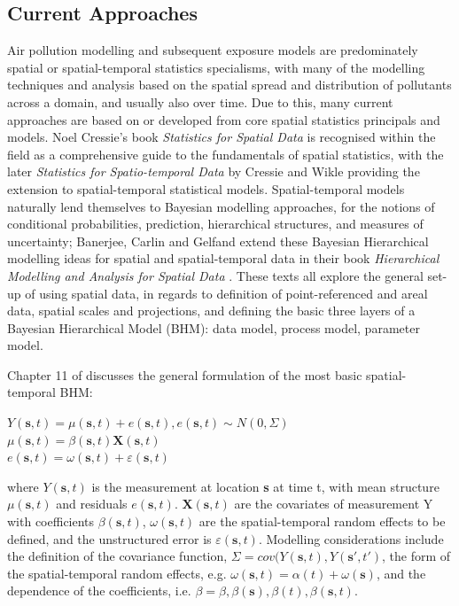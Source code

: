 \subsection{Current Approaches}
Air pollution modelling and subsequent exposure models are predominately spatial or spatial-temporal statistics specialisms, with many of the modelling techniques and analysis based on the spatial spread and distribution of pollutants across a domain, and usually also over time. Due to this, many current approaches are based on or developed from core spatial statistics principals and models. Noel Cressie's book \textit{Statistics for Spatial Data} \citep{Cressie2015} is recognised within the field as a comprehensive guide to the fundamentals of spatial statistics, with the later \textit{Statistics for Spatio-temporal Data} \citep{Cressie2011StatisticsData} by Cressie and Wikle providing the extension to spatial-temporal statistical models. Spatial-temporal models naturally lend themselves to Bayesian modelling approaches, for the notions of conditional probabilities, prediction, hierarchical structures, and measures of uncertainty; Banerjee, Carlin and Gelfand extend these Bayesian Hierarchical modelling ideas for spatial and spatial-temporal data in their book \textit{Hierarchical Modelling and Analysis for Spatial Data} \citep{Banerjee2014}. These texts all explore the general set-up of using spatial data, in regards to definition of point-referenced and areal data, spatial scales and projections, and defining the basic three layers of a Bayesian Hierarchical Model (BHM): data model, process model, parameter model. 

Chapter 11 of \cite{Banerjee2014} discusses the general formulation of the most basic spatial-temporal BHM:
\begin{center}
$ Y(\textbf{s},t) = \mu(\textbf{s},t)  + e(\textbf{s},t), e(\textbf{s},t) \sim N(0, \Sigma)$ \\
$ \mu(\textbf{s},t) = \beta(\textbf{s},t) \textbf{X}(\textbf{s},t)$ \\
$ e(\textbf{s},t) = \omega(\textbf{s},t)  + \varepsilon(\textbf{s},t) $ \\
\end{center}
where $Y(\textbf{s},t)$ is the measurement at location \textbf{s} at time t, with mean structure $\mu(\textbf{s},t)$ and residuals $e(\textbf{s},t)$. $\textbf{X}(\textbf{s},t)$ are the covariates of measurement Y with coefficients $\beta(\textbf{s},t)$, $\omega(\textbf{s},t)$ are the spatial-temporal random effects to be defined, and the unstructured error is $\varepsilon(\textbf{s},t)$. Modelling considerations include the definition of the covariance function, $\Sigma = cov(Y(\textbf{s},t), Y(\textbf{s}',t')$, the form of the spatial-temporal random effects, e.g. $\omega(\textbf{s},t) = \alpha(t) + \omega(\textbf{s})$, and the dependence of the coefficients, i.e. $\beta = \beta, \beta(\textbf{s}), \beta(t), \beta(\textbf{s},t)$.

